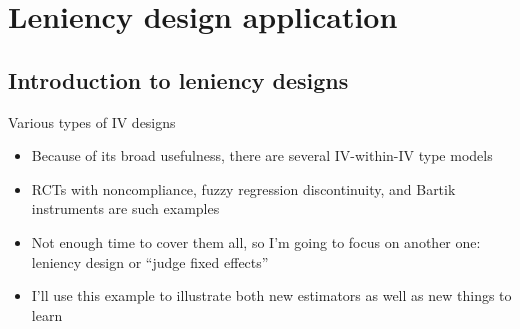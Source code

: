 \documentclass{beamer}
\begin{document}



\section{Leniency design application}


\subsection{Introduction to leniency designs}

\begin{frame}{Various types of IV designs}
  \begin{itemize}
    \item Because of its broad usefulness, there are several IV-within-IV type models
    \item RCTs with noncompliance, fuzzy regression discontinuity, and Bartik instruments are such examples
    \item Not enough time to cover them all, so I'm going to focus on another one: leniency design or ``judge fixed effects''
    \item I'll use this example to illustrate both new estimators as well as new things to learn
  \end{itemize}

\end{frame}
\end{document}
